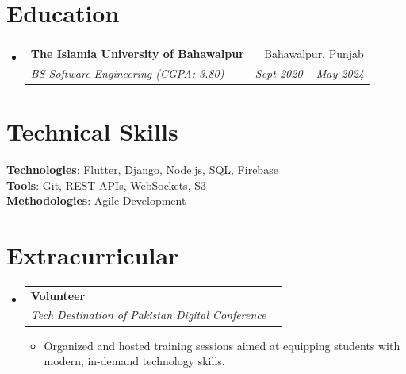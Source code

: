\documentclass[letterpaper,11pt]{article}
\makeatletter
\newcommand{\resumeItem}[1]{
  \item\small{{#1 \vspace{-2pt}}}
}
\newcommand{\resumeSubheading}[4]{
  \vspace{-2pt}\item
    \begin{tabular*}{0.97\textwidth}[t]{l@{\extracolsep{\fill}}r}
      \textbf{#1} & #2 \\
      \textit{\small#3} & \textit{\small #4} \\
    \end{tabular*}\vspace{-7pt}
}
\newcommand{\resumeSubHeadingListStart}{\begin{itemize}[leftmargin=0.15in, label={}]}
\newcommand{\resumeSubHeadingListEnd}{\end{itemize}}
\newcommand{\resumeItemListStart}{\begin{itemize}}
\newcommand{\resumeItemListEnd}{\end{itemize}\vspace{-5pt}}
\makeatother
\begin{document}
\section{Education}
\resumeSubHeadingListStart

\resumeSubheading
{The Islamia University of Bahawalpur}{Bahawalpur, Punjab}
{BS Software Engineering (CGPA: 3.80)}{Sept 2020 -- May 2024}

\resumeSubHeadingListEnd

\section{Technical Skills}
\begin{itemize}[leftmargin=0.15in, label={}]
\small{
\item{
\textbf{Technologies}{: Flutter, Django, Node.js, SQL, Firebase} \\
\textbf{Tools}{: Git, REST APIs, WebSockets, S3} \\
\textbf{Methodologies}{: Agile Development}
}}
\end{itemize}

\section{Extracurricular}
\resumeSubHeadingListStart
\resumeSubheading
{Volunteer}{}
{Tech Destination of Pakistan Digital Conference}{}
\resumeItemListStart
\resumeItem{Organized and hosted training sessions aimed at equipping students with modern, in-demand technology skills.}
\resumeItemListEnd
\resumeSubHeadingListEnd
\end{document}
